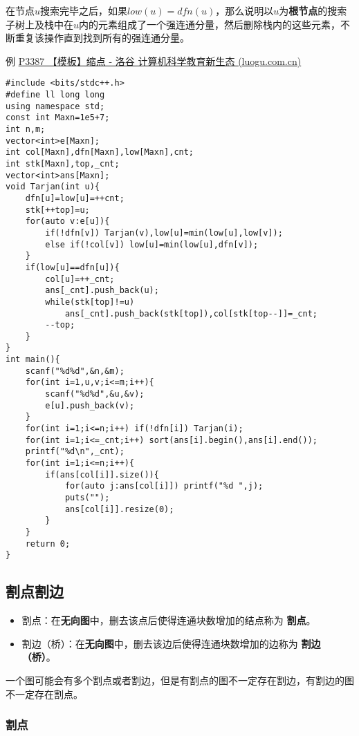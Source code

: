 \documentclass[]{article}
\providecommand{\tightlist}{%
  \setlength{\itemsep}{0pt}\setlength{\parskip}{0pt}}
\begin{document}
在节点\(u\)搜索完毕之后，如果\(low(u)=dfn(u)\)，那么说明以\(u\)为\textbf{根节点}的搜索子树上及栈中在\(u\)内的元素组成了一个强连通分量，然后删除栈内的这些元素，不断重复该操作直到找到所有的强连通分量。

例 \href{https://www.luogu.com.cn/problem/P3387}{P3387 【模板】缩点 -
洛谷 \textbar{} 计算机科学教育新生态 (luogu.com.cn)}

\begin{verbatim}
#include <bits/stdc++.h>
#define ll long long
using namespace std;
const int Maxn=1e5+7;
int n,m;
vector<int>e[Maxn];
int col[Maxn],dfn[Maxn],low[Maxn],cnt;
int stk[Maxn],top,_cnt;
vector<int>ans[Maxn];
void Tarjan(int u){
    dfn[u]=low[u]=++cnt;
    stk[++top]=u;
    for(auto v:e[u]){
        if(!dfn[v]) Tarjan(v),low[u]=min(low[u],low[v]);
        else if(!col[v]) low[u]=min(low[u],dfn[v]);
    }
    if(low[u]==dfn[u]){
        col[u]=++_cnt;
        ans[_cnt].push_back(u);
        while(stk[top]!=u)  
            ans[_cnt].push_back(stk[top]),col[stk[top--]]=_cnt;
        --top;
    }
}
int main(){
    scanf("%d%d",&n,&m);
    for(int i=1,u,v;i<=m;i++){
        scanf("%d%d",&u,&v);
        e[u].push_back(v);
    }
    for(int i=1;i<=n;i++) if(!dfn[i]) Tarjan(i);
    for(int i=1;i<=_cnt;i++) sort(ans[i].begin(),ans[i].end());
    printf("%d\n",_cnt);
    for(int i=1;i<=n;i++){
        if(ans[col[i]].size()){
            for(auto j:ans[col[i]]) printf("%d ",j);
            puts("");
            ans[col[i]].resize(0);
        }
    }
    return 0;
}
\end{verbatim}

\hypertarget{ux5272ux70b9ux5272ux8fb9}{%
\subsection{割点割边}\label{ux5272ux70b9ux5272ux8fb9}}

\begin{itemize}
\tightlist
\item
  割点：在\textbf{无向图}中，删去该点后使得连通块数增加的结点称为
  \textbf{割点}。
\item
  割边（桥）：在\textbf{无向图}中，删去该边后使得连通块数增加的边称为
  \textbf{割边（桥）}。
\end{itemize}

一个图可能会有多个割点或者割边，但是有割点的图不一定存在割边，有割边的图不一定存在割点。

\hypertarget{ux5272ux70b9}{%
\subsubsection{割点}\label{ux5272ux70b9}}
\end{document}
